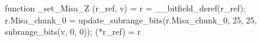 function _set_Misa_Z (r_ref, v) = {
    r = __bitfield_deref(r_ref);
    r.Misa_chunk_0 = update_subrange_bits(r.Misa_chunk_0, 25, 25, subrange_bits(v, 0, 0));
    (*r_ref) = r
}
